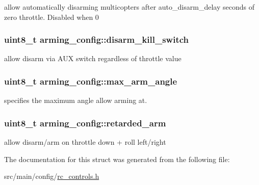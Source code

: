 allow automatically disarming multicopters after auto\+\_\+disarm\+\_\+delay seconds of zero throttle. Disabled when 0 

\hypertarget{structarming__config_acc0f84a6d1171a1a5860cfc94ebdcd1d}{
\subsubsection[{disarm\+\_\+kill\+\_\+switch}]{\setlength{\rightskip}{0pt plus 5cm}uint8\+\_\+t arming\+\_\+config\+::disarm\+\_\+kill\+\_\+switch}}\label{structarming__config_acc0f84a6d1171a1a5860cfc94ebdcd1d}


allow disarm via A\+U\+X switch regardless of throttle value 

\hypertarget{structarming__config_a02175f326375063ce0436b7026c24fd1}{
\subsubsection[{max\+\_\+arm\+\_\+angle}]{\setlength{\rightskip}{0pt plus 5cm}uint8\+\_\+t arming\+\_\+config\+::max\+\_\+arm\+\_\+angle}}\label{structarming__config_a02175f326375063ce0436b7026c24fd1}


specifies the maximum angle allow arming at. 

\hypertarget{structarming__config_a4eaf67fe36c6b358f01805370a9f253f}{
\subsubsection[{retarded\+\_\+arm}]{\setlength{\rightskip}{0pt plus 5cm}uint8\+\_\+t arming\+\_\+config\+::retarded\+\_\+arm}}\label{structarming__config_a4eaf67fe36c6b358f01805370a9f253f}


allow disarm/arm on throttle down + roll left/right 



The documentation for this struct was generated from the following file\+:\begin{DoxyCompactItemize}
\item 
src/main/config/\hyperlink{rc__controls_8h}{rc\+\_\+controls.\+h}\end{DoxyCompactItemize}
